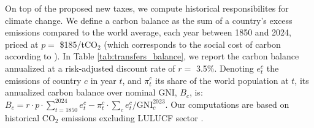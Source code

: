 \documentclass[12pt,english]{article}
\begin{document}
\begin{bibunit}
On top of the proposed new taxes, we compute historical responsibilites for climate change. We define a carbon balance as the sum of a country's excess emissions compared to the world average, each year between 1850 and 2024, priced at $p=$ \$185/tCO$_\text{2}$ (which corresponds to the social cost of carbon according to \citealp{rennert_comprehensive_2022}). 
In Table \ref{tab:transfers_balance}, we report the carbon balance annualized at a risk-adjusted discount rate of $r =$ 3.5\%. Denoting $e_t^c$ the emissions of country $c$ in year $t$, and $\pi_t^c$ its share of the world population at $t$, its annualized carbon balance over nominal GNI, $B_c$, is: $ B_c = r \cdot p \cdot \sum_{t=1850}^{2024} e_t^c - \pi_t^c \cdot \sum_c e_t^c / \text{GNI}_c^{2023}\text{.}$ Our computations are based on historical CO$_\text{2}$ emissions excluding LULUCF sector \citep{gutschow_country-resolved_2021}.

\clearpage
\renewcommand{\url}[1]{\href{#1}{Link}} 
\putbib
\end{bibunit}


% 
%         
\end{document}
